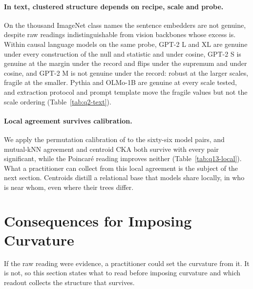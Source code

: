 \documentclass{article}
\begin{document}
\paragraph{In text, clustered structure depends on recipe, scale and probe.} On the thousand ImageNet class names the sentence embedders are not genuine, despite raw readings indistinguishable from vision backbones whose excess is. Within causal language models on the same probe, GPT-2 L and XL are genuine under every construction of the null and statistic and under cosine, GPT-2 S is genuine at the margin under the record and flips under the supremum and under cosine, and GPT-2 M is not genuine under the record: robust at the larger scales, fragile at the smaller. Pythia and OLMo-1B are genuine at every scale tested, and extraction protocol and prompt template move the fragile values but not the scale ordering (Table~\ref{tab:q2-text}). %

\paragraph{Local agreement survives calibration.} We apply the permutation calibration of \citet{groger2026aristotelian} to the sixty-six model pairs, and mutual-kNN agreement and centroid CKA both survive with every pair significant, while the Poincar\'{e} reading improves neither (Table~\ref{tab:q13-local}). What a practitioner can collect from this local agreement is the subject of the next section. Centroids distill a relational base that models share locally, in who is near whom, even where their trees differ. %

\section{Consequences for Imposing Curvature}
\label{sec:practice}

If the raw reading were evidence, a practitioner could set the curvature from it. It is not, so this section states what to read before imposing curvature and which readout collects the structure that survives.
\end{document}
